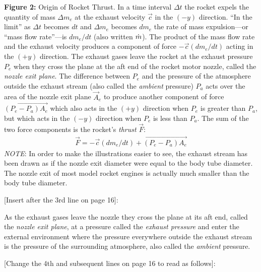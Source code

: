 \noindent\textbf{Figure 2:} Origin of Rocket Thrust. In a time interval $\Delta t$ the rocket expels the
quantity of mass $\Delta m_e$ at the exhaust velocity $\vec{c}$ in the $(-y)$ direction. ``In the limit'' as
$\Delta t$ becomes $dt$ and $\Delta m_e$ becomes $dm_e$ the rate of mass expulsion---or ``mass flow
rate''---is $dm_e/dt$ (also written $\dot{m}$). The product of the mass flow rate and the exhaust velocity
produces a component of force $-\vec{c}(dm_e/dt)$ acting in the $(+y)$ direction. The exhaust gases leave
the rocket at the exhaust pressure $P_e$ when they cross the plane at the aft end of the rocket motor
nozzle, called the \emph{nozzle exit plane}. The difference between $P_e$ and the pressure of the atmosphere
outside the exhaust stream (also called the \emph{ambient} pressure) $P_a$ acts over the area of the nozzle
exit plane $\vec{A}_e$ to produce another component of force $\overrightarrow{(P_e - P_a)A_e}$ which also
acts in the $(+y)$ direction when $P_e$ is greater than $P_a$, but which acts in the $(-y)$ direction when
$P_e$ is less than $P_a$. The sum of the two force components is the rocket's \emph{thrust} $\vec{F}$:
\begin{gather*}
\vec{F} = -\vec{c}(dm_e/dt) + \overrightarrow{(P_e - P_a)A_e}
\end{gather*}
\emph{NOTE}: In order to make the illustrations easier to see, the exhaust stream has been drawn as if the
nozzle exit diameter were equal to the body tube diameter. The nozzle exit of most model rocket engines is
actually much smaller than the body tube diameter.

\begin{center}
[Insert after the 3rd line on page 16]:
\end{center}

As the exhaust gases leave the nozzle they cross the plane at its aft end, called the \emph{nozzle exit
plane}, at a pressure called the \emph{exhaust pressure} and enter the external environment where the
pressure everywhere outside the exhaust stream is the pressure of the surrounding atmosphere, also called the
\emph{ambient} pressure.

\begin{center}
[Change the 4th and subsequent lines on page 16 to read as follows]:
\end{center}

